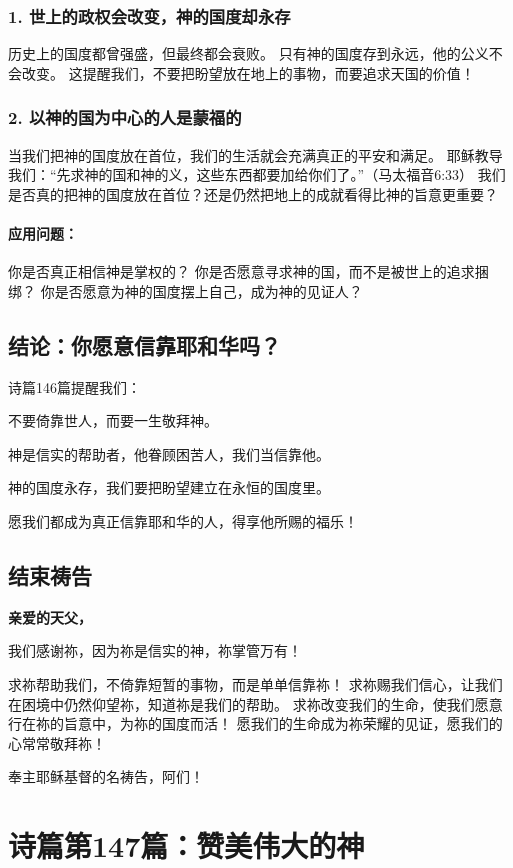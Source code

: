 \documentclass[a4paper, 12pt]{article}
\begin{document}
\subsubsection*{1. 世上的政权会改变，神的国度却永存}
历史上的国度都曾强盛，但最终都会衰败。
只有神的国度存到永远，他的公义不会改变。
这提醒我们，不要把盼望放在地上的事物，而要追求天国的价值！
\subsubsection*{2. 以神的国为中心的人是蒙福的}
当我们把神的国度放在首位，我们的生活就会充满真正的平安和满足。
耶稣教导我们：“先求神的国和神的义，这些东西都要加给你们了。”（马太福音6:33）
我们是否真的把神的国度放在首位？还是仍然把地上的成就看得比神的旨意更重要？
\paragraph*{应用问题：}
你是否真正相信神是掌权的？
你是否愿意寻求神的国，而不是被世上的追求捆绑？
你是否愿意为神的国度摆上自己，成为神的见证人？
\subsection*{结论：你愿意信靠耶和华吗？}
诗篇146篇提醒我们：

不要倚靠世人，而要一生敬拜神。

神是信实的帮助者，他眷顾困苦人，我们当信靠他。

神的国度永存，我们要把盼望建立在永恒的国度里。

愿我们都成为真正信靠耶和华的人，得享他所赐的福乐！

\subsection*{结束祷告}
\textbf{亲爱的天父，}

我们感谢祢，因为祢是信实的神，祢掌管万有！

求祢帮助我们，不倚靠短暂的事物，而是单单信靠祢！
求祢赐我们信心，让我们在困境中仍然仰望祢，知道祢是我们的帮助。
求祢改变我们的生命，使我们愿意行在祢的旨意中，为祢的国度而活！
愿我们的生命成为祢荣耀的见证，愿我们的心常常敬拜祢！

奉主耶稣基督的名祷告，阿们！
\newpage
\section{诗篇第147篇：赞美伟大的神}
\end{document}

